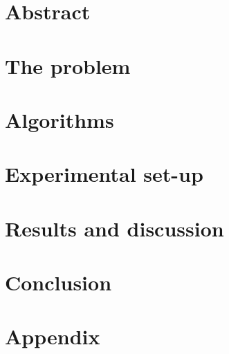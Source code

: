 \documentclass[a4paper,10pt,twoside]{report}
\author{\me}
\begin{document}


\normalsize

\chapter*{Abstract}\label{chapter:Abstract}
\setcounter{page}{0}


\tableofcontents

\chapter{The problem}\label{chapter:Introduction}
\setcounter{page}{0}


\chapter{Algorithms}\label{chapter:Algorithms}


\chapter{Experimental set-up}\label{chapter:Experimental set-up}


\chapter{Results and discussion}\label{chapter:Results and discussion}


\chapter{Conclusion}\label{chapter:Conclusion}




\newpage

\appendix
{}
\chapter{Appendix}\label{chapter:Appendix A}

\end{document}
